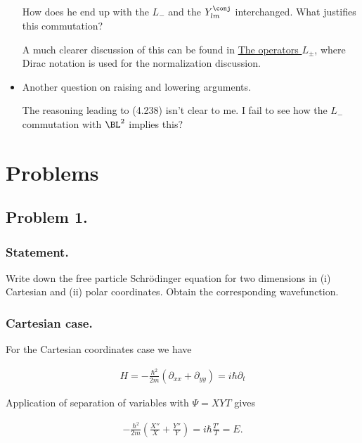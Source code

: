 \begin{itemize}
How does he end up with the $L_{-}$ and the $Y_{lm}^\conj$ interchanged.  What justifies this commutation?

A much clearer discussion of this can be found in \href{http://quantummechanics.ucsd.edu/ph130a/130_notes/node217.html}{The operators $L_{\pm}$}, where Dirac notation is used for the normalization discussion.

\item Another question on raising and lowering arguments.

The reasoning leading to (4.238) isn't clear to me.  I fail to see how the $L_{-}$ commutation with $\BL^2$ implies this?

\end{itemize}



\section{Problems}

\subsection{Problem 1.}
\subsubsection{Statement.}

Write down the free particle Schr\"{o}dinger equation for two dimensions in (i) Cartesian and (ii) polar coordinates.  Obtain the corresponding wavefunction.

\subsubsection{Cartesian case.}

For the Cartesian coordinates case we have 

\begin{align}\label{eqn:desaiCh4:100}
H = -\frac{\hbar^2}{2m} (\partial_{xx} + \partial_{yy}) = i \hbar \partial_t
\end{align}

Application of separation of variables with $\Psi = XYT$ gives 

\begin{align}\label{eqn:desaiCh4:101}
-\frac{\hbar^2}{2m} \left( \frac{X''}{X} +\frac{Y''}{Y} \right) = i \hbar \frac{T'}{T} = E .
\end{align}

